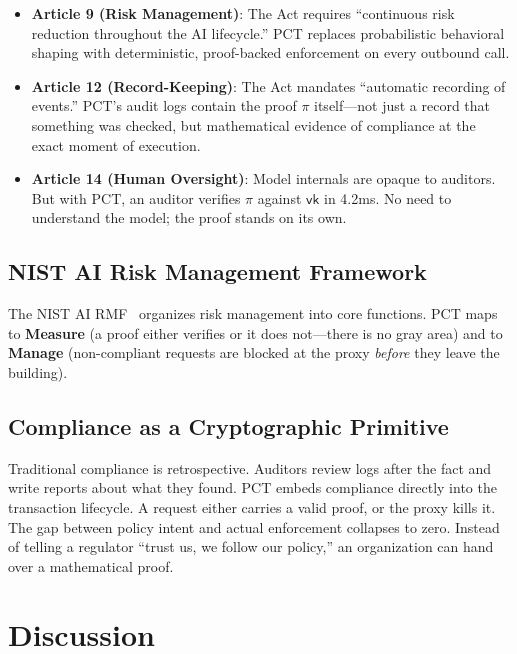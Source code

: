 \documentclass[10pt,conference]{IEEEtran}
\begin{document}
\begin{itemize}
    \item \textbf{Article 9 (Risk Management)}: The Act requires ``continuous risk reduction throughout the AI lifecycle.'' PCT replaces probabilistic behavioral shaping with deterministic, proof-backed enforcement on every outbound call.
    \item \textbf{Article 12 (Record-Keeping)}: The Act mandates ``automatic recording of events.'' PCT's audit logs contain the proof $\pi$ itself---not just a record that something was checked, but mathematical evidence of compliance at the exact moment of execution.
    \item \textbf{Article 14 (Human Oversight)}: Model internals are opaque to auditors. But with PCT, an auditor verifies $\pi$ against $\mathsf{vk}$ in 4.2ms. No need to understand the model; the proof stands on its own.
\end{itemize}

\subsection{NIST AI Risk Management Framework}

The NIST AI RMF~\cite{nistrmf} organizes risk management into core functions. PCT maps to \textbf{Measure} (a proof either verifies or it does not---there is no gray area) and to \textbf{Manage} (non-compliant requests are blocked at the proxy \emph{before} they leave the building).

\subsection{Compliance as a Cryptographic Primitive}

Traditional compliance is retrospective. Auditors review logs after the fact and write reports about what they found. PCT embeds compliance directly into the transaction lifecycle. A request either carries a valid proof, or the proxy kills it. The gap between policy intent and actual enforcement collapses to zero. Instead of telling a regulator ``trust us, we follow our policy,'' an organization can hand over a mathematical proof.

\section{Discussion}
\label{sec:discussion}
\end{document}
